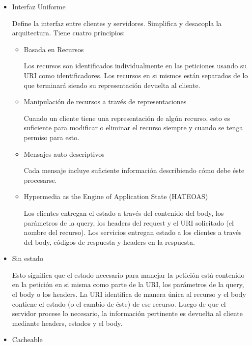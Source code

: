 \begin{itemize}
   \item Interfaz Uniforme
	
	Define la interfaz entre clientes y servidores. Simplifica y desacopla la 
	arquitectura. Tiene cuatro principios:
	   
   \begin{itemize}
     \item Basada en Recursos
     
	Los recursos son identificados individualmente en las peticiones usando su URI como
	identificadores. Los recursos en si mismos están separados de lo que terminará siendo 
	su representación devuelta al cliente.     
     
     \item Manipulación de recursos a través de representaciones
     
     Cuando un cliente tiene una representación de algún recurso, esto es suficiente 
     para modificar o eliminar el recurso siempre y cuando se tenga permiso para esto.
     
     \item Mensajes auto descriptivos
     
     Cada mensaje incluye suficiente información describiendo cómo debe éste procesarse.
     
     \item Hypermedia as the Engine of Application State (HATEOAS)
     
     Los clientes entregan el estado a través del contenido del body, los parámetros de
     la query, los headers del request y el URI solicitado (el nombre del recurso). 
     Los servicios entregan estado a los clientes a través del
     body, códigos de respuesta y headers en la respuesta.
   \end{itemize}
   
	\item Sin estado
	
	Esto significa que el estado necesario para manejar la petición está contenido en 
	la petición en si misma como parte de la URI, los parámetros de la query, el body o 
	los headers. La URI identifica de manera única al recurso y el body contiene el estado 
	(o el cambio de éste) de ese recurso. Luego de que el servidor procese lo necesario, 
	la información pertinente es devuelta al cliente mediante headers, estados y el body.
	
	\item Cacheable
	

\end{itemize}
